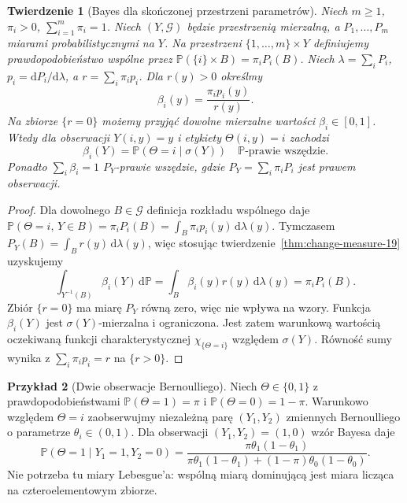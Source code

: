 \documentclass[11pt,a4paper,oneside]{book}
\numberwithin{equation}{chapter}
\theoremstyle{plain}
\newtheorem{twierdzenie}{Twierdzenie}[chapter]
\theoremstyle{definition}
\newtheorem{przyklad}[twierdzenie]{Przykład}
\theoremstyle{remark}
\begin{document}
\begin{twierdzenie}[Bayes dla skończonej przestrzeni parametrów]
\label{thm:bayes-finite-19}
Niech $m\ge1$, $\pi_i>0$, $\sum_{i=1}^m\pi_i=1$.
Niech $(Y,\mathcal G)$ będzie przestrzenią mierzalną,
a $P_1,\ldots,P_m$ miarami probabilistycznymi na $Y$.
Na przestrzeni $\{1,\ldots,m\}\times Y$ definiujemy
prawdopodobieństwo wspólne przez
$\mathbb P(\{i\}\times B)=\pi_iP_i(B)$.
Niech $\lambda=\sum_iP_i$, $p_i=\mathrm dP_i/\mathrm d\lambda$,
a $r=\sum_i\pi_i p_i$. Dla $r(y)>0$ określmy
\[
 \beta_i(y)=\frac{\pi_i p_i(y)}{r(y)}.
\]
Na zbiorze $\{r=0\}$ możemy przyjąć dowolne mierzalne
wartości $\beta_i\in[0,1]$. Wtedy dla obserwacji
$Y(i,y)=y$ i etykiety $\Theta(i,y)=i$ zachodzi
\begin{equation}\label{eq:bayes-finite-19}
 \beta_i(Y)=\mathbb P(\Theta=i\mid\sigma(Y))
 \quad\mathbb P\text{-prawie wszędzie}.
\end{equation}
Ponadto $\sum_i\beta_i=1$ $P_Y$-prawie wszędzie,
gdzie $P_Y=\sum_i\pi_iP_i$ jest prawem obserwacji.
\end{twierdzenie}
\begin{proof}
Dla dowolnego $B\in\mathcal G$ definicja rozkładu
wspólnego daje
$\mathbb P(\Theta=i,\,Y\in B)=\pi_iP_i(B)
=\int_B\pi_ip_i(y)\,\mathrm d\lambda(y)$.
Tymczasem $P_Y(B)=\int_Br(y)\,\mathrm d\lambda(y)$,
więc stosując twierdzenie~\ref{thm:change-measure-19}
uzyskujemy
\[
\int_{Y^{-1}(B)}\beta_i(Y)\,\mathrm d\mathbb P
=\int_B\beta_i(y)r(y)\,\mathrm d\lambda(y)
=\pi_iP_i(B).
\]
Zbiór $\{r=0\}$ ma miarę $P_Y$ równą zero, więc nie
wpływa na wzory. Funkcja $\beta_i(Y)$ jest
$\sigma(Y)$-mierzalna i ograniczona. Jest zatem
warunkową wartością oczekiwaną funkcji charakterystycznej
$\chi_{\{\Theta=i\}}$ względem $\sigma(Y)$.
Równość sumy wynika z $\sum_i\pi_ip_i=r$ na $\{r>0\}$.
\end{proof}

\begin{przyklad}[Dwie obserwacje Bernoulliego]
Niech $\Theta\in\{0,1\}$ z prawdopodobieństwami
$\mathbb P(\Theta=1)=\pi$ i $\mathbb P(\Theta=0)=1-\pi$.
Warunkowo względem $\Theta=i$ zaobserwujmy
niezależną parę $(Y_1,Y_2)$ zmiennych Bernoulliego
o parametrze $\theta_i\in(0,1)$. Dla obserwacji
$(Y_1,Y_2)=(1,0)$ wzór Bayesa daje
\[
\mathbb P(\Theta=1\mid Y_1=1,Y_2=0)
=\frac{\pi\theta_1(1-\theta_1)}
{\pi\theta_1(1-\theta_1)+(1-\pi)\theta_0(1-\theta_0)}.
\]
Nie potrzeba tu miary Lebesgue'a: wspólną miarą
dominującą jest miara licząca na czteroelementowym zbiorze.
\end{przyklad}
\end{document}
